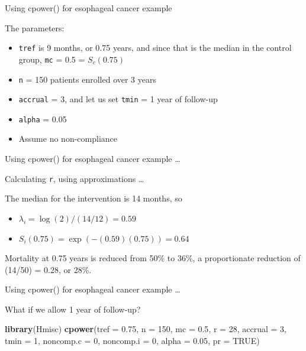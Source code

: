 \documentclass[ignorenonframetext,]{beamer}
\newenvironment{Shaded}{\begin{snugshade}}{\end{snugshade}}
\newcommand{\DataTypeTok}[1]{\textcolor[rgb]{0.13,0.29,0.53}{#1}}
\newcommand{\DecValTok}[1]{\textcolor[rgb]{0.00,0.00,0.81}{#1}}
\newcommand{\FloatTok}[1]{\textcolor[rgb]{0.00,0.00,0.81}{#1}}
\newcommand{\KeywordTok}[1]{\textcolor[rgb]{0.13,0.29,0.53}{\textbf{#1}}}
\newcommand{\NormalTok}[1]{#1}
\newcommand{\OtherTok}[1]{\textcolor[rgb]{0.56,0.35,0.01}{#1}}
\providecommand{\tightlist}{%
  \setlength{\itemsep}{0pt}\setlength{\parskip}{0pt}}
\begin{document}
\begin{frame}{%
\protect\hypertarget{using-cpower-for-esophageal-cancer-example}{%
Using cpower() for esophageal cancer example}}

The parameters:

\begin{itemize}
\tightlist
\item
  \texttt{tref} is 9 months, or 0.75 years, and since that is the median
  in the control group, \texttt{mc} = 0.5 = \(S_c(0.75)\)
\item
  \texttt{n} = 150 patients enrolled over 3 years
\item
  \texttt{accrual} = 3, and let us set \texttt{tmin} = 1 year of
  follow-up
\item
  \texttt{alpha} = 0.05\\
\item
  Assume no non-compliance
\end{itemize}

\end{frame}

\begin{frame}{%
\protect\hypertarget{using-cpower-for-esophageal-cancer-example-1}{%
Using cpower() for esophageal cancer example \ldots}}

Calculating \texttt{r}, using approximations \ldots

The median for the intervention is 14 months, so

\begin{itemize}
\item
  \(\lambda_i = \log(2)/(14/12) = 0.59\)
\item
  \(S_i(0.75) = \exp(-(0.59)(0.75)) = 0.64\)
\end{itemize}

Mortality at 0.75 years is reduced from 50\% to 36\%, a proportionate
reduction of (14/50) = 0.28, or 28\%.

\end{frame}

\begin{frame}[fragile]{%
\protect\hypertarget{using-cpower-for-esophageal-cancer-example-2}{%
Using cpower() for esophageal cancer example \ldots}}

What if we allow 1 year of follow-up?

\scriptsize

\begin{Shaded}
\begin{Highlighting}[]
\KeywordTok{library}\NormalTok{(Hmisc)}
\KeywordTok{cpower}\NormalTok{(}\DataTypeTok{tref =} \FloatTok{0.75}\NormalTok{, }\DataTypeTok{n =} \DecValTok{150}\NormalTok{, }\DataTypeTok{mc =} \FloatTok{0.5}\NormalTok{, }
       \DataTypeTok{r =} \DecValTok{28}\NormalTok{, }\DataTypeTok{accrual =} \DecValTok{3}\NormalTok{, }\DataTypeTok{tmin =} \DecValTok{1}\NormalTok{, }
       \DataTypeTok{noncomp.c =} \DecValTok{0}\NormalTok{, }\DataTypeTok{noncomp.i =} \DecValTok{0}\NormalTok{, }
       \DataTypeTok{alpha =} \FloatTok{0.05}\NormalTok{, }\DataTypeTok{pr =} \OtherTok{TRUE}\NormalTok{)   }
\end{Highlighting}
\end{Shaded}

\end{frame}
\end{document}
